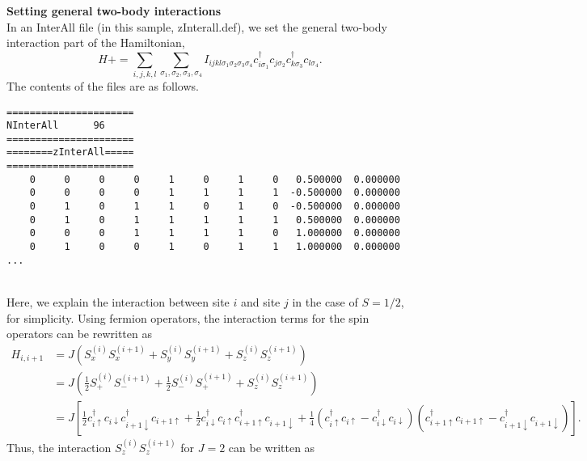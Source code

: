\begin{description}
\item {\bf Setting general two-body interactions}\\
  In an InterAll file (in this sample, zInterall.def),
  we set the general two-body interaction part of the Hamiltonian,
\begin{equation}
H+=\sum_{i,j,k,l}\sum_{\sigma_1,\sigma_2, \sigma_3, \sigma_4}
I_{ijkl\sigma_1\sigma_2\sigma_3\sigma_4}c_{i\sigma_1}^{\dagger}c_{j\sigma_2}c_{k\sigma_3}^{\dagger}c_{l\sigma_4}.
\end{equation}
The contents of the files are as follows.\\
\begin{minipage}{16cm}
\begin{screen}
\begin{verbatim}
====================== 
NInterAll      96  
====================== 
========zInterAll===== 
====================== 
    0     0     0     0     1     0     1     0   0.500000  0.000000
    0     0     0     0     1     1     1     1  -0.500000  0.000000
    0     1     0     1     1     0     1     0  -0.500000  0.000000
    0     1     0     1     1     1     1     1   0.500000  0.000000
    0     0     0     1     1     1     1     0   1.000000  0.000000
    0     1     0     0     1     0     1     1   1.000000  0.000000
...
\end{verbatim}
\end{screen}
\end{minipage}
~\\
Here, we explain the interaction between site $i$ and site $j$ {in the case of $S=1/2$}, for simplicity.
Using fermion operators, the interaction terms for the spin operators can be rewritten as
\begin{align}
H_{i,i+1}&=J(S_x^{(i)}S_x^{(i+1)}+S_y^{(i)}S_y^{(i+1)}+S_z^{(i)}S_z^{(i+1)}) \nonumber\\
&=J \left( \frac{1}{2}S_+^{(i)}S_-^{(i+1)}+\frac{1}{2}S_-^{(i)}S_+^{(i+1)}+S_z^{(i)}S_z^{(i+1)} \right) \nonumber\\
&=J \left[ \frac{1}{2}c_{i\uparrow}^{\dag}c_{i\downarrow}c_{i+1\downarrow}^{\dag}c_{i+1\uparrow}+\frac{1}{2}c_{i\downarrow}^{\dag}c_{i\uparrow}c_{i+1\uparrow}^{\dag}c_{i+1\downarrow}+\frac{1}{4}(c_{i\uparrow}^{\dag}c_{i\uparrow}-c_{i\downarrow}^{\dag}c_{i\downarrow})(c_{i+1\uparrow}^{\dag}c_{i+1\uparrow}-c_{i+1\downarrow}^{\dag}c_{i+1\downarrow}) \right]. \nonumber 
\end{align}
Thus, the interaction $S_z^{(i)}S_z^{(i+1)}$ for $J=2$ can be written as \\

\end{description}
